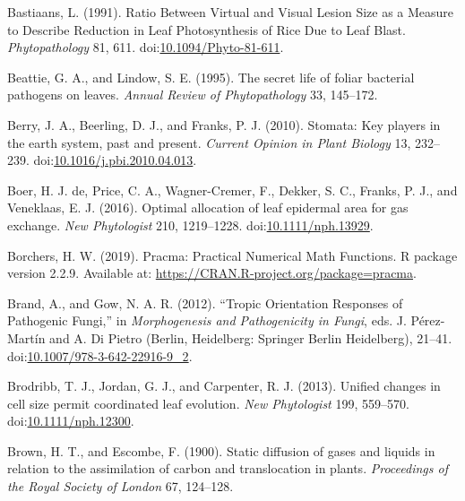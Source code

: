 \documentclass[utf8]{frontiersSCNS}
\begin{document}
\leavevmode\hypertarget{ref-bastiaans_ratio_1991}{}%
Bastiaans, L. (1991). Ratio Between Virtual and Visual Lesion Size as a
Measure to Describe Reduction in Leaf Photosynthesis of Rice Due to Leaf
Blast. \emph{Phytopathology} 81, 611.
doi:\href{https://doi.org/10.1094/Phyto-81-611}{10.1094/Phyto-81-611}.

\leavevmode\hypertarget{ref-beattie_secret_1995}{}%
Beattie, G. A., and Lindow, S. E. (1995). The secret life of foliar
bacterial pathogens on leaves. \emph{Annual Review of Phytopathology}
33, 145--172.

\leavevmode\hypertarget{ref-berry_stomata:_2010}{}%
Berry, J. A., Beerling, D. J., and Franks, P. J. (2010). Stomata: Key
players in the earth system, past and present. \emph{Current Opinion in
Plant Biology} 13, 232--239.
doi:\href{https://doi.org/10.1016/j.pbi.2010.04.013}{10.1016/j.pbi.2010.04.013}.

\leavevmode\hypertarget{ref-de_boer_optimal_2016}{}%
Boer, H. J. de, Price, C. A., Wagner-Cremer, F., Dekker, S. C., Franks,
P. J., and Veneklaas, E. J. (2016). Optimal allocation of leaf epidermal
area for gas exchange. \emph{New Phytologist} 210, 1219--1228.
doi:\href{https://doi.org/10.1111/nph.13929}{10.1111/nph.13929}.

\leavevmode\hypertarget{ref-borchers_pracma:_2019}{}%
Borchers, H. W. (2019). Pracma: Practical Numerical Math Functions. R
package version 2.2.9. Available at:
\url{https://CRAN.R-project.org/package=pracma}.

\leavevmode\hypertarget{ref-perez-martin_tropic_2012}{}%
Brand, A., and Gow, N. A. R. (2012). ``Tropic Orientation Responses of
Pathogenic Fungi,'' in \emph{Morphogenesis and Pathogenicity in Fungi},
eds. J. Pérez-Martín and A. Di Pietro (Berlin, Heidelberg: Springer
Berlin Heidelberg), 21--41.
doi:\href{https://doi.org/10.1007/978-3-642-22916-9_2}{10.1007/978-3-642-22916-9\_2}.

\leavevmode\hypertarget{ref-brodribb_unified_2013}{}%
Brodribb, T. J., Jordan, G. J., and Carpenter, R. J. (2013). Unified
changes in cell size permit coordinated leaf evolution. \emph{New
Phytologist} 199, 559--570.
doi:\href{https://doi.org/10.1111/nph.12300}{10.1111/nph.12300}.

\leavevmode\hypertarget{ref-brown_static_1900}{}%
Brown, H. T., and Escombe, F. (1900). Static diffusion of gases and
liquids in relation to the assimilation of carbon and translocation in
plants. \emph{Proceedings of the Royal Society of London} 67, 124--128.
\end{document}
